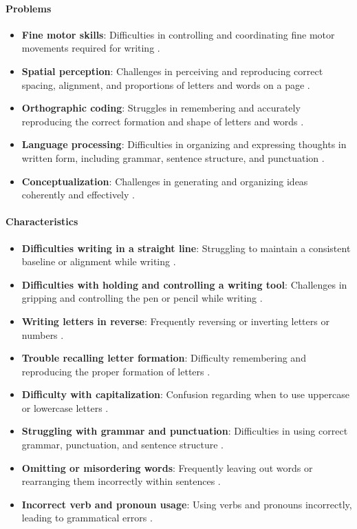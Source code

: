 \paragraph{Problems}
\begin{itemize}
    \item \textbf{Fine motor skills}: Difficulties in controlling and coordinating fine motor movements required for writing \cite{cleveland_dysgraphia}.
    \item \textbf{Spatial perception}: Challenges in perceiving and reproducing correct spacing, alignment, and proportions of letters and words on a page \cite{cleveland_dysgraphia}.
    \item \textbf{Orthographic coding}: Struggles in remembering and accurately reproducing the correct formation and shape of letters and words \cite{cleveland_dysgraphia}.
    \item \textbf{Language processing}: Difficulties in organizing and expressing thoughts in written form, including grammar, sentence structure, and punctuation \cite{cleveland_dysgraphia}.
    \item \textbf{Conceptualization}: Challenges in generating and organizing ideas coherently and effectively \cite{cleveland_dysgraphia}.
\end{itemize}

\paragraph{Characteristics}
\begin{itemize}
    \item \textbf{Difficulties writing in a straight line}: Struggling to maintain a consistent baseline or alignment while writing \cite{cleveland_dysgraphia}.
    \item \textbf{Difficulties with holding and controlling a writing tool}: Challenges in gripping and controlling the pen or pencil while writing \cite{understood_accommodations}.
    \item \textbf{Writing letters in reverse}: Frequently reversing or inverting letters or numbers \cite{pmc_dysgraphia}.
    \item \textbf{Trouble recalling letter formation}: Difficulty remembering and reproducing the proper formation of letters \cite{edutopia_dysgraphia}.
    \item \textbf{Difficulty with capitalization}: Confusion regarding when to use uppercase or lowercase letters \cite{cleveland_dysgraphia}.
    \item \textbf{Struggling with grammar and punctuation}: Difficulties in using correct grammar, punctuation, and sentence structure \cite{cleveland_dysgraphia}.
    \item \textbf{Omitting or misordering words}: Frequently leaving out words or rearranging them incorrectly within sentences \cite{cleveland_dysgraphia}.
    \item \textbf{Incorrect verb and pronoun usage}: Using verbs and pronouns incorrectly, leading to grammatical errors \cite{cleveland_dysgraphia}.
\end{itemize}

